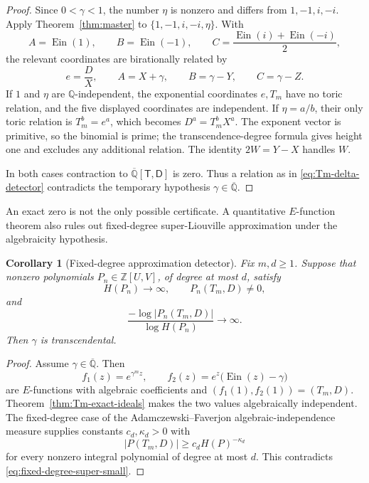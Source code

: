\documentclass[11pt]{article}
\newtheorem{corollary}[theorem]{Corollary}
\theoremstyle{definition}
\theoremstyle{remark}
\newcommand{\Q}{\mathbb Q}
\newcommand{\Qbar}{\overline{\mathbb Q}}
\newcommand{\Z}{\mathbb Z}
\newcommand{\Ein}{\operatorname{Ein}}
\begin{document}
\begin{proof}
Since \(0<\gamma<1\), the number \(\eta\) is nonzero and differs from
\(1,-1,i,-i\).  Apply Theorem~\ref{thm:master} to
\(\{1,-1,i,-i,\eta\}\).  With
\[
 A=\Ein(1),\qquad B=\Ein(-1),\qquad
 C=\frac{\Ein(i)+\Ein(-i)}2,
\]
the relevant coordinates are birationally related by
\[
 e=\frac D X,\qquad A=X+\gamma,\qquad
 B=\gamma-Y,\qquad C=\gamma-Z.
\]
If \(1\) and \(\eta\) are \(\Q\)-independent, the exponential coordinates
\(e,T_m\) have no toric relation, and the five displayed coordinates are
independent.  If \(\eta=a/b\), their only toric relation is
\(T_m^b=e^a\), which becomes
\(D^a=T_m^bX^a\).  The exponent vector is primitive, so the binomial is
prime; the transcendence-degree formula gives height one and excludes any
additional relation.  The identity \(2W=Y-X\) handles \(W\).

In both cases contraction to \(\Qbar[\mathsf T,\mathsf D]\) is zero.  Thus
a relation as in \eqref{eq:Tm-delta-detector} contradicts the temporary
hypothesis \(\gamma\in\Qbar\).
\end{proof}

An exact zero is not the only possible certificate.  A quantitative
\(E\)-function theorem also rules out fixed-degree super-Liouville
approximation under the algebraicity hypothesis.

\begin{corollary}[Fixed-degree approximation detector]
\label{cor:fixed-degree-gamma-detector}
Fix \(m,d\ge1\).  Suppose that nonzero polynomials
\(P_n\in\Z[U,V]\), of degree at most \(d\), satisfy
\[
 H(P_n)\longrightarrow\infty,\qquad
 P_n(T_m,D)\ne0,
\]
and
\begin{equation}\label{eq:fixed-degree-super-small}
 \frac{-\log|P_n(T_m,D)|}{\log H(P_n)}\longrightarrow\infty.
\end{equation}
Then \(\gamma\) is transcendental.
\end{corollary}

\begin{proof}
Assume \(\gamma\in\Qbar\).  Then
\[
 f_1(z)=e^{\gamma^m z},\qquad
 f_2(z)=e^z\bigl(\Ein(z)-\gamma\bigr)
\]
are \(E\)-functions with algebraic coefficients and
\((f_1(1),f_2(1))=(T_m,D)\).  Theorem~\ref{thm:Tm-exact-ideals} makes the
two values algebraically independent.  The fixed-degree case of the
Adamczewski--Faverjon algebraic-independence measure
\cite{AdamczewskiFaverjon2025} supplies constants \(c_d,\kappa_d>0\) with
\[
 |P(T_m,D)|\ge c_dH(P)^{-\kappa_d}
\]
for every nonzero integral polynomial of degree at most \(d\).  This
contradicts \eqref{eq:fixed-degree-super-small}.
\end{proof}
\end{document}
